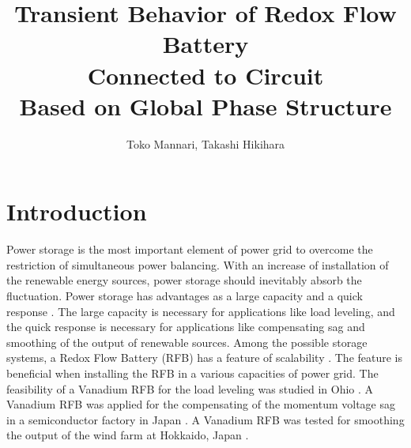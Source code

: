 \documentclass[a4paper]{article}
\title{Transient Behavior of Redox Flow Battery \\Connected to Circuit \\ Based on Global Phase Structure}
\author{Toko Mannari, Takashi Hikihara}
\begin{document}

\maketitle

\section{Introduction}
Power storage is the most important element of power grid to
overcome the restriction of simultaneous power balancing.
With an increase of installation of the renewable energy sources, 
power storage should inevitably absorb the fluctuation. 
Power storage has advantages as a large capacity and a quick response \cite{eng-science-storage-grid}. 
The large capacity is necessary for applications like load leveling,
and the quick response is necessary for applications like compensating sag  and smoothing of the output of renewable sources. 
Among the possible storage systems, 
a Redox Flow Battery (RFB) has a feature of scalability \cite{eng-Microgrids-RFB-characteristic,eng-EESRSGB-RFB}.
The feature is beneficial when installing the RFB in a various capacities of power grid. 
The feasibility of a Vanadium RFB for the load leveling was studied in Ohio \cite{eng-kazacos-review}. 
A Vanadium RFB was applied for the compensating of the momentum voltage sag in a semiconductor factory in Japan \cite{eng-SEI-RFB-renewable}.
A Vanadium RFB was tested for smoothing the output of the wind farm at Hokkaido, Japan \cite{eng-shigematsu-windfarm-shuntei,eng-SEI-RFB-renewable}.
\end{document}
